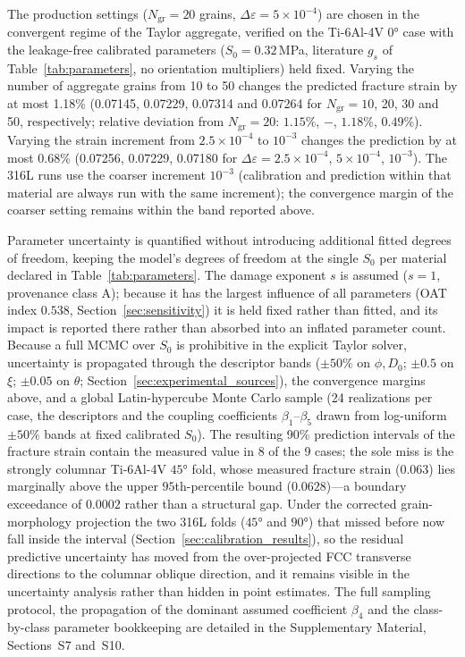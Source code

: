 \documentclass[twocolumn]{sagej}
\begin{document}
The production settings ($N_{\mathrm{gr}}=20$ grains, $\Delta\varepsilon = 5\times10^{-4}$) are chosen in the convergent regime of the Taylor aggregate, verified on the Ti-6Al-4V $\ang{0}$ case with the leakage-free calibrated parameters ($S_0=0.32$\,MPa, literature $g_s$ of Table~\ref{tab:parameters}, no orientation multipliers) held fixed. Varying the number of aggregate grains from 10 to 50 changes the predicted fracture strain by at most 1.18\% (0.07145, 0.07229, 0.07314 and 0.07264 for $N_{\mathrm{gr}} = 10$, 20, 30 and 50, respectively; relative deviation from $N_{\mathrm{gr}}=20$: $1.15\%$, $-$, $1.18\%$, $0.49\%$). Varying the strain increment from $2.5\times10^{-4}$ to $10^{-3}$ changes the prediction by at most 0.68\% (0.07256, 0.07229, 0.07180 for $\Delta\varepsilon = 2.5\times10^{-4}$, $5\times10^{-4}$, $10^{-3}$). The 316L runs use the coarser increment $10^{-3}$ (calibration and prediction within that material are always run with the same increment); the convergence margin of the coarser setting remains within the band reported above.

\label{sec:uncertainty}Parameter uncertainty is quantified without introducing additional fitted degrees of freedom, keeping the model's degrees of freedom at the single $S_0$ per material declared in Table~\ref{tab:parameters}. The damage exponent $s$ is assumed ($s=1$, provenance class A); because it has the largest influence of all parameters (OAT index $0.538$, Section~\ref{sec:sensitivity}) it is held fixed rather than fitted, and its impact is reported there rather than absorbed into an inflated parameter count. Because a full MCMC over $S_0$ is prohibitive in the explicit Taylor solver, uncertainty is propagated through the descriptor bands ($\pm50\%$ on $\phi,D_0$; $\pm0.5$ on $\xi$; $\pm0.05$ on $\theta$; Section~\ref{sec:experimental_sources}), the convergence margins above, and a global Latin-hypercube Monte Carlo sample (24 realizations per case, the descriptors and the coupling coefficients $\beta_1$--$\beta_5$ drawn from log-uniform $\pm50\%$ bands at fixed calibrated $S_0$). The resulting 90\% prediction intervals of the fracture strain contain the measured value in 8 of the 9 cases; the sole miss is the strongly columnar Ti-6Al-4V $\ang{45}$ fold, whose measured fracture strain ($0.063$) lies marginally above the upper $95$th-percentile bound ($0.0628$)---a boundary exceedance of $0.0002$ rather than a structural gap. Under the corrected grain-morphology projection the two 316L folds ($\ang{45}$ and $\ang{90}$) that missed before now fall inside the interval (Section~\ref{sec:calibration_results}), so the residual predictive uncertainty has moved from the over-projected FCC transverse directions to the columnar oblique direction, and it remains visible in the uncertainty analysis rather than hidden in point estimates. The full sampling protocol, the propagation of the dominant assumed coefficient $\beta_4$ and the class-by-class parameter bookkeeping are detailed in the Supplementary Material, Sections~S7 and~S10.
\end{document}
